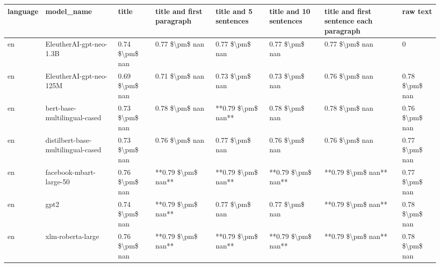 \begin{tabular}{llllllll}
\toprule
language &                         model\_name &          title & title and first paragraph & title and 5 sentences & title and 10 sentences & title and first sentence each paragraph &           raw text \\
\midrule
      en &            EleutherAI-gpt-neo-1.3B & 0.74 \$\textbackslash pm\$ nan &            0.77 \$\textbackslash pm\$ nan &        0.77 \$\textbackslash pm\$ nan &         0.77 \$\textbackslash pm\$ nan &                          0.77 \$\textbackslash pm\$ nan &                  0 \\
      en &            EleutherAI-gpt-neo-125M & 0.69 \$\textbackslash pm\$ nan &            0.71 \$\textbackslash pm\$ nan &        0.73 \$\textbackslash pm\$ nan &         0.73 \$\textbackslash pm\$ nan &                          0.76 \$\textbackslash pm\$ nan &     0.78 \$\textbackslash pm\$ nan \\
      en &       bert-base-multilingual-cased & 0.73 \$\textbackslash pm\$ nan &            0.78 \$\textbackslash pm\$ nan &    **0.79 \$\textbackslash pm\$ nan** &         0.78 \$\textbackslash pm\$ nan &                          0.78 \$\textbackslash pm\$ nan &     0.76 \$\textbackslash pm\$ nan \\
      en & distilbert-base-multilingual-cased & 0.73 \$\textbackslash pm\$ nan &            0.76 \$\textbackslash pm\$ nan &        0.77 \$\textbackslash pm\$ nan &         0.76 \$\textbackslash pm\$ nan &                          0.76 \$\textbackslash pm\$ nan &     0.77 \$\textbackslash pm\$ nan \\
      en &            facebook-mbart-large-50 & 0.76 \$\textbackslash pm\$ nan &        **0.79 \$\textbackslash pm\$ nan** &    **0.79 \$\textbackslash pm\$ nan** &     **0.79 \$\textbackslash pm\$ nan** &                      **0.79 \$\textbackslash pm\$ nan** &     0.77 \$\textbackslash pm\$ nan \\
      en &                               gpt2 & 0.74 \$\textbackslash pm\$ nan &        **0.79 \$\textbackslash pm\$ nan** &        0.77 \$\textbackslash pm\$ nan &         0.77 \$\textbackslash pm\$ nan &                      **0.79 \$\textbackslash pm\$ nan** &     0.78 \$\textbackslash pm\$ nan \\
      en &                  xlm-roberta-large & 0.76 \$\textbackslash pm\$ nan &        **0.79 \$\textbackslash pm\$ nan** &    **0.79 \$\textbackslash pm\$ nan** &     **0.79 \$\textbackslash pm\$ nan** &                      **0.79 \$\textbackslash pm\$ nan** &     0.78 \$\textbackslash pm\$ nan \\

\end{tabular}

